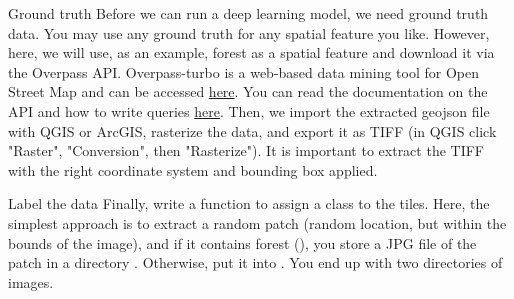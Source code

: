 \documentclass[twoside]{article}
\begin{document}
\begin{task}{Ground truth}{}{}
Before we can run a deep learning model, we need ground truth data.
You may use any ground truth for any spatial feature you like.
However, here, we will use, as an example, forest as a spatial feature and download it via the Overpass API.
Overpass-turbo is a web-based data mining tool for Open Street Map and can be accessed \href{https://overpass-turbo.eu/}{here}.
You can read the documentation on the API and how to write queries \href{https://wiki.openstreetmap.org/wiki/Overpass_API/Overpass_QL}{here}.
Then, we import the extracted geojson file with QGIS or ArcGIS, rasterize the data, and export it as TIFF (in QGIS click "Raster", "Conversion", then "Rasterize").
It is important to extract the TIFF with the right coordinate system and bounding box applied.

\end{task}

\clearpage

\begin{task}{Label the data}{}{}
Finally, write a function  to assign a class to the tiles.
Here, the simplest approach is to extract a random patch (random location, but within the bounds of the image), and if it contains forest (), you store a JPG file of the patch in a directory . Otherwise, put it into .
You end up with two directories of images.

\end{task}









\end{document}
